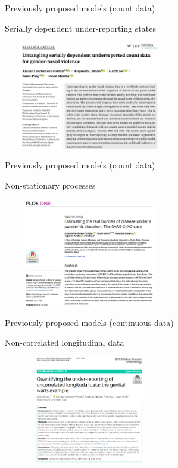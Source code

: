 \documentclass[aspectratio=169,usepdftitle=true]{beamer}
\begin{document}
\begin{frame}[c]{Previously proposed models (count data)}
    \begin{block}{Serially dependent under-reporting states}
        \begin{center}
           \includegraphics[height=4.7cm,width=7.5cm]{SiM2.png}
        \end{center}
    \end{block}
\end{frame}

\begin{frame}[c]{Previously proposed models (count data)}
    \begin{block}{Non-stationary processes}
        \begin{center}
           \includegraphics[height=4.7cm,width=7.5cm]{Plos.png}
        \end{center}
    \end{block}
\end{frame}

\begin{frame}[c]{Previously proposed models (continuous data)}
    \begin{block}{Non-correlated longitudinal data}
        \begin{center}
           \includegraphics[height=4.7cm,width=7.5cm]{MRM.png}
        \end{center}
    \end{block}
\end{frame}
\end{document}
